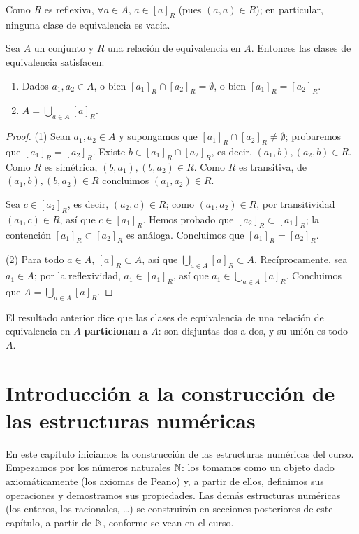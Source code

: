 \documentclass[12pt,a4paper]{book}
\begin{document}
    Como $R$ es reflexiva, $\forall a\in A$, $a\in[a]_R$ (pues $(a,a)\in R$); en particular, ninguna clase de equivalencia es vacía.

    \begin{proposicion}
        \label{prop:particion}
        Sea $A$ un conjunto y $R$ una relación de equivalencia en $A$. Entonces las clases de equivalencia satisfacen:
        \begin{enumerate}[label=(\arabic*)]
            \item Dados $a_1,a_2\in A$, o bien $[a_1]_R\cap[a_2]_R=\emptyset$, o bien $[a_1]_R=[a_2]_R$.
            \item $A = \displaystyle\bigcup_{a\in A}[a]_R$.
        \end{enumerate}
    \end{proposicion}

    \begin{proof}
        (1) Sean $a_1,a_2\in A$ y supongamos que $[a_1]_R\cap[a_2]_R\neq\emptyset$; probaremos que $[a_1]_R=[a_2]_R$. Existe $b\in[a_1]_R\cap[a_2]_R$, es decir, $(a_1,b),(a_2,b)\in R$. Como $R$ es simétrica, $(b,a_1),(b,a_2)\in R$. Como $R$ es transitiva, de $(a_1,b),(b,a_2)\in R$ concluimos $(a_1,a_2)\in R$.

        Sea $c\in[a_2]_R$, es decir, $(a_2,c)\in R$; como $(a_1,a_2)\in R$, por transitividad $(a_1,c)\in R$, así que $c\in[a_1]_R$. Hemos probado que $[a_2]_R\subset[a_1]_R$; la contención $[a_1]_R\subset[a_2]_R$ es análoga. Concluimos que $[a_1]_R=[a_2]_R$.

        (2) Para todo $a\in A$, $[a]_R\subset A$, así que $\bigcup_{a\in A}[a]_R \subset A$. Recíprocamente, sea $a_1\in A$; por la reflexividad, $a_1\in[a_1]_R$, así que $a_1\in\bigcup_{a\in A}[a]_R$. Concluimos que $A=\bigcup_{a\in A}[a]_R$.
    \end{proof}

    El resultado anterior dice que las clases de equivalencia de una relación de equivalencia en $A$ \textbf{particionan} a $A$: son disjuntas dos a dos, y su unión es todo $A$.

    \chapter{Introducción a la construcción de las estructuras numéricas}
    \label{chap:numeros}

    En este capítulo iniciamos la construcción de las estructuras numéricas del curso. Empezamos por los números naturales $\mathbb{N}$: los tomamos como un objeto dado axiomáticamente (los axiomas de Peano) y, a partir de ellos, definimos sus operaciones y demostramos sus propiedades. Las demás estructuras numéricas (los enteros, los racionales, \dots) se construirán en secciones posteriores de este capítulo, a partir de $\mathbb{N}$, conforme se vean en el curso.
\end{document}
